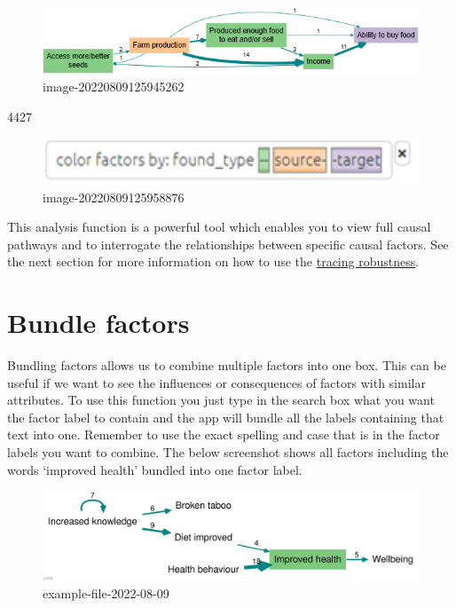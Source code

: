 \documentclass[
]{book}
\begin{document}
\begin{figure}
\centering
\includegraphics[width=6.77083in,height=\textheight]{_assets/image-20220809125945262.png}
\caption{image-20220809125945262}
\end{figure}

4427

\begin{figure}
\centering
\includegraphics[width=6.77083in,height=\textheight]{_assets/image-20220809125958876.png}
\caption{image-20220809125958876}
\end{figure}

This analysis function is a powerful tool which enables you to view full causal pathways and to interrogate the relationships between specific causal factors. See the next section for more information on how to use the \protect\hyperlink{xrobustness}{tracing robustness}.

\hypertarget{bundlefactors}{%
\section{Bundle factors}\label{bundlefactors}}

Bundling factors allows us to combine multiple factors into one box. This can be useful if we want to see the influences or consequences of factors with similar attributes. To use this function you just type in the search box what you want the factor label to contain and the app will bundle all the labels containing that text into one. Remember to use the exact spelling and case that is in the factor labels you want to combine. The below screenshot shows all factors including the words `improved health' bundled into one factor label.

\begin{figure}
\centering
\includegraphics[width=6.77083in,height=\textheight]{_assets/example-file-2022-08-09.svg}
\caption{example-file-2022-08-09}
\end{figure}
\end{document}
